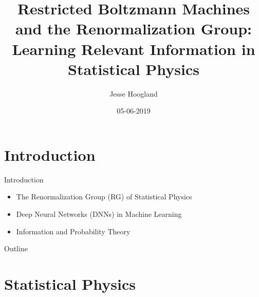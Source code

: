 \documentclass{beamer}
\title[RBMs and RG: Learning Relevant Information]{Restricted Boltzmann Machines and the Renormalization Group: Learning Relevant Information in Statistical Physics}
\author{Jesse Hoogland}
\institute{Amsterdam University College}
\date{05-06-2019}
\begin{document}


\begin{frame}
  \titlepage
\end{frame}

\section{Introduction}
\begin{frame}{Introduction}
  \begin{itemize}
  \item The Renormalization Group (RG) of Statistical Physics
  \item Deep Neural Networks (DNNs) in Machine Learning
  \item Information and Probability Theory
  \end{itemize}
\end{frame}


\begin{frame}{Outline}
  \tableofcontents
\end{frame}

\section{Statistical Physics}

\end{document}
